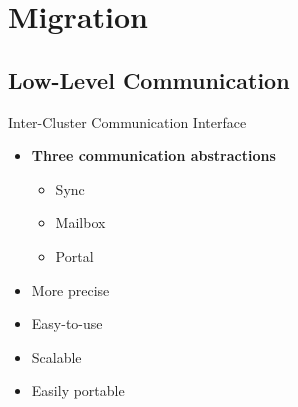 \section{Migration}

	\subsection{Low-Level Communication}

		\begin{frame}[fragile]{Inter-Cluster Communication Interface}

			\begin{itemize}
				\item \textbf{Three communication abstractions}
				\begin{itemize}
					\item Sync
					\item Mailbox
					\item Portal
				\end{itemize}
				\item More precise
				\item Easy-to-use
				\item Scalable
				\item Easily portable
			\end{itemize}


		\end{frame}

